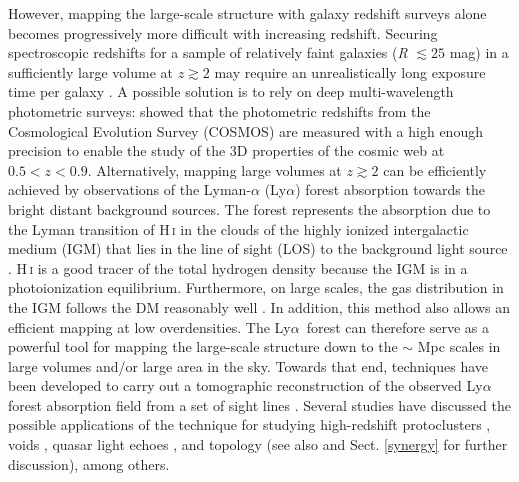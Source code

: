 \documentclass{aa}
\newcommand{\lya}{Ly$\alpha$}
\begin{document}
However, mapping the large-scale structure with galaxy redshift surveys alone becomes progressively more difficult with increasing redshift. Securing spectroscopic redshifts for a sample of relatively faint galaxies ({\it R} $\lesssim25$ mag) in a sufficiently large volume at $z \gtrsim 2$ may require an unrealistically long exposure time per galaxy \citep[e.g.][]{Lee2014a}. A possible solution is to rely on deep multi-wavelength photometric surveys: \citet{Laigle2018} showed that the photometric redshifts from the Cosmological Evolution Survey (COSMOS) \citep{Scoville2007} are measured with a high enough precision \citep{Laigle2016} to enable the study of the 3D properties of the cosmic web at $0.5 < z < 0.9$. Alternatively, mapping large volumes at $z \gtrsim 2$ can be efficiently achieved by observations of the Lyman-$\alpha$ (\lya) forest absorption towards the bright distant background sources. The forest represents the absorption due to the Lyman transition of H\,\textsc{i} in the clouds of the highly ionized intergalactic medium (IGM) that lies in the line of sight (LOS) to the background light source \citep{Gunn1965}. H\,\textsc{i} is a good tracer of the total hydrogen density because the IGM is in a photoionization equilibrium. Furthermore, on large scales, the gas distribution in the IGM follows the DM reasonably well \citep[e.g.][]{Cen1994,Petitjean1995,Viel2004,Caucci2008,Cui2018}. In addition, this method also allows an efficient mapping at low overdensities. The \lya\, forest can therefore serve as a powerful tool for mapping the large-scale structure down to the $\sim$ Mpc scales in large volumes and/or large area in the sky. Towards that end, techniques have been developed to carry out a tomographic reconstruction of the observed \lya\, forest absorption field from a set of sight lines \citep[e.g.][]{Pichon2001,Caucci2008,cisewski14,horowitz19}. Several studies have discussed the possible applications of the technique for studying high-redshift protoclusters \citep{Stark2015b}, voids \citep{Stark2015b}, quasar light echoes \citep{Visbal2008,Schmidt2019}, and topology \citep{Caucci2008} (see also \citealt{Lee2014a} and Sect. \ref{synergy} for further discussion), among others.
\end{document}

